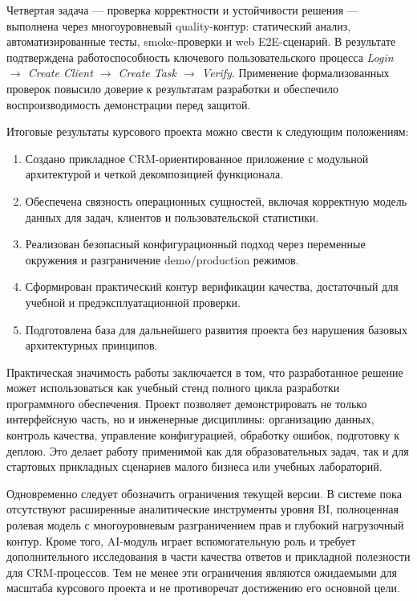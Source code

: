 Четвертая задача --- проверка корректности и устойчивости решения --- выполнена через многоуровневый quality-контур: статический анализ, автоматизированные тесты, smoke-проверки и web E2E-сценарий. В результате подтверждена работоспособность ключевого пользовательского процесса \textit{Login $\rightarrow$ Create Client $\rightarrow$ Create Task $\rightarrow$ Verify}. Применение формализованных проверок повысило доверие к результатам разработки и обеспечило воспроизводимость демонстрации перед защитой.

Итоговые результаты курсового проекта можно свести к следующим положениям:
\begin{enumerate}
  \item Создано прикладное CRM-ориентированное приложение с модульной архитектурой и четкой декомпозицией функционала.
  \item Обеспечена связность операционных сущностей, включая корректную модель данных для задач, клиентов и пользовательской статистики.
  \item Реализован безопасный конфигурационный подход через переменные окружения и разграничение demo/production режимов.
  \item Сформирован практический контур верификации качества, достаточный для учебной и предэксплуатационной проверки.
  \item Подготовлена база для дальнейшего развития проекта без нарушения базовых архитектурных принципов.
\end{enumerate}

Практическая значимость работы заключается в том, что разработанное решение может использоваться как учебный стенд полного цикла разработки программного обеспечения. Проект позволяет демонстрировать не только интерфейсную часть, но и инженерные дисциплины: организацию данных, контроль качества, управление конфигурацией, обработку ошибок, подготовку к деплою. Это делает работу применимой как для образовательных задач, так и для стартовых прикладных сценариев малого бизнеса или учебных лабораторий.

Одновременно следует обозначить ограничения текущей версии. В системе пока отсутствуют расширенные аналитические инструменты уровня BI, полноценная ролевая модель с многоуровневым разграничением прав и глубокий нагрузочный контур. Кроме того, AI-модуль играет вспомогательную роль и требует дополнительного исследования в части качества ответов и прикладной полезности для CRM-процессов. Тем не менее эти ограничения являются ожидаемыми для масштаба курсового проекта и не противоречат достижению его основной цели.

